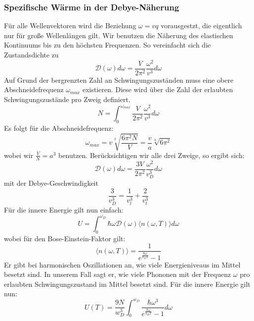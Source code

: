 \documentclass[11pt]{article}
\begin{document}
\subsubsection{Spezifische Wärme in der Debye-Näherung}
Für alle Wellenvektoren wird die Beziehung $\omega=vq$ vorausgestzt, die
eigentlich nur für große Wellenlängen gilt. Wir benutzen die Näherung des
elastischen Kontinuums bis zu den höchsten Frequenzen. So vereinfacht sich die
Zustandsdichte zu
\begin{equation}
  \mathcal{D}(\omega)d\omega=\frac{V}{2\pi^2}\frac{\omega^2}{v^3}d\omega
\end{equation}
Auf Grund der bergrenzten Zahl an Schwingungszuständen muss eine obere
Abschneidefrequenz $\omega_{max}$ existieren. Diese wird über die Zahl der
erlaubten Schwingungszustände pro Zweig definiert.
\begin{equation}
  N = \int_0^{\omega_{max}}\frac{V}{2\pi^2}\frac{\omega^2}{v^3}d\omega
\end{equation}
Es folgt für die Abschneidefrequenz:
\begin{equation}
  \omega_{max}=v\sqrt[3]{\frac{6\pi^2N}{V}}=\frac{v}{a}\sqrt[3]{6\pi^2}
\end{equation}
wobei wir $\frac{V}{N}=a^3$ benutzen. Berücksichtigen wir alle drei Zweige, so
ergibt sich:
\begin{equation}
  \mathcal{D}(\omega)d\omega=\frac{3V}{2\pi^2}\frac{\omega^2}{v^3_D}d\omega
\end{equation}
mit der Debye-Geschwindigkeit
\begin{equation}
  \frac{3}{v_D^3}=\frac{1}{v_l^3}+\frac{2}{v_t^3}
\end{equation}
Für die innere Energie gilt nun einfach:
\begin{equation}
  U=\int_0^{\omega_D}\hbar\omega\mathcal{D}(\omega)\langle n(\omega,T)\rangle
  d\omega
\end{equation}
wobei für den Bose-Einstein-Faktor gilt:
\begin{equation}
  \langle n(\omega,T)\rangle=\frac{1}{e^{\frac{\hbar\omega}{k_BT}}-1}
\end{equation}
Er gibt bei harmonischen Oszillationen an, wie viele Energieniveaus im
Mittel besetzt sind. In unserem Fall sagt er, wie viele Phononen mit der
Frequenz $\omega$ pro erlaubten Schwingungszustand im Mittel besetzt sind.
Für die innere Energie gilt nun:
\begin{equation}
  U(T)=\frac{9N}{w_D^3}\int_0^{w_D}\frac{\hbar\omega^3}{e^{\frac{\hbar
  \omega}{k_BT}}-1}d\omega
\end{equation}
\end{document}
